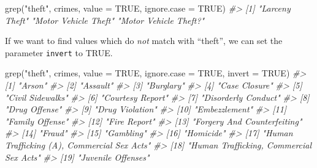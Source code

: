 \documentclass[
  12pt,
]{book}
\newenvironment{Shaded}{\begin{snugshade}}{\end{snugshade}}
\newcommand{\AttributeTok}[1]{\textcolor[rgb]{0.61,0.61,0.61}{#1}}
\newcommand{\CommentTok}[1]{\textcolor[rgb]{0.37,0.37,0.37}{\textit{#1}}}
\newcommand{\ConstantTok}[1]{\textcolor[rgb]{0,0,0}{#1}}
\newcommand{\FunctionTok}[1]{\textcolor[rgb]{0,0,0}{#1}}
\newcommand{\NormalTok}[1]{#1}
\newcommand{\StringTok}[1]{\textcolor[rgb]{0.5,0.5,0.5}{#1}}
\begin{document}
\begin{Shaded}
\begin{Highlighting}[]
\FunctionTok{grep}\NormalTok{(}\StringTok{"theft"}\NormalTok{, crimes, }\AttributeTok{value =} \ConstantTok{TRUE}\NormalTok{, }\AttributeTok{ignore.case =} \ConstantTok{TRUE}\NormalTok{)}
\CommentTok{\#\textgreater{} [1] "Larceny Theft"        "Motor Vehicle Theft"  "Motor Vehicle Theft?"}
\end{Highlighting}
\end{Shaded}

If we want to find values which do \emph{not} match with ``theft'', we can set the parameter \texttt{invert} to TRUE.

\begin{Shaded}
\begin{Highlighting}[]
\FunctionTok{grep}\NormalTok{(}\StringTok{"theft"}\NormalTok{, crimes, }\AttributeTok{value =} \ConstantTok{TRUE}\NormalTok{, }\AttributeTok{ignore.case =} \ConstantTok{TRUE}\NormalTok{, }\AttributeTok{invert =} \ConstantTok{TRUE}\NormalTok{)}
\CommentTok{\#\textgreater{}  [1] "Arson"                                     }
\CommentTok{\#\textgreater{}  [2] "Assault"                                   }
\CommentTok{\#\textgreater{}  [3] "Burglary"                                  }
\CommentTok{\#\textgreater{}  [4] "Case Closure"                              }
\CommentTok{\#\textgreater{}  [5] "Civil Sidewalks"                           }
\CommentTok{\#\textgreater{}  [6] "Courtesy Report"                           }
\CommentTok{\#\textgreater{}  [7] "Disorderly Conduct"                        }
\CommentTok{\#\textgreater{}  [8] "Drug Offense"                              }
\CommentTok{\#\textgreater{}  [9] "Drug Violation"                            }
\CommentTok{\#\textgreater{} [10] "Embezzlement"                              }
\CommentTok{\#\textgreater{} [11] "Family Offense"                            }
\CommentTok{\#\textgreater{} [12] "Fire Report"                               }
\CommentTok{\#\textgreater{} [13] "Forgery And Counterfeiting"                }
\CommentTok{\#\textgreater{} [14] "Fraud"                                     }
\CommentTok{\#\textgreater{} [15] "Gambling"                                  }
\CommentTok{\#\textgreater{} [16] "Homicide"                                  }
\CommentTok{\#\textgreater{} [17] "Human Trafficking (A), Commercial Sex Acts"}
\CommentTok{\#\textgreater{} [18] "Human Trafficking, Commercial Sex Acts"    }
\CommentTok{\#\textgreater{} [19] "Juvenile Offenses"                         }

\end{Highlighting}
\end{Shaded}
\end{document}
